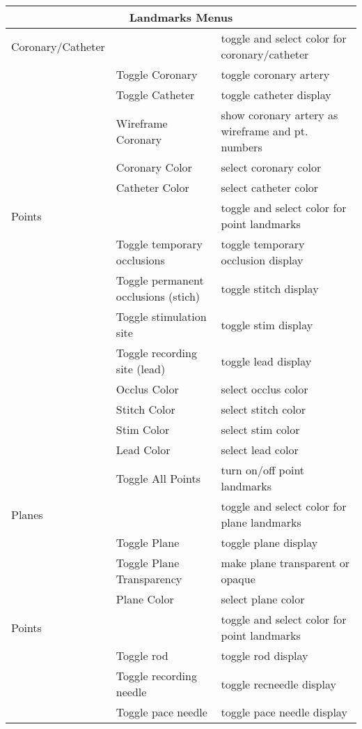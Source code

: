 \begin{table}[ht]
  \begin{center}
    \begin{tabular}{|l|p{1.5in}|p{3 in}|} \hline
      \multicolumn{3}{|c|}{\textbf{Landmarks Menus}} \\ \hline
    Coronary/Catheter & & toggle and select color for coronary/catheter\\
    & Toggle Coronary & toggle coronary artery \\
    & Toggle Catheter & toggle catheter display \\ 
    & Wireframe Coronary & show coronary artery as wireframe and pt. numbers\\
    & Coronary Color & select coronary color \\
    & Catheter Color & select catheter color \\ \hline
    Points & & toggle and select color for point landmarks\\
    & Toggle temporary occlusions & toggle temporary occlusion display\\
    & Toggle permanent occlusions (stich) & toggle stitch display \\ 
    & Toggle stimulation site & toggle stim display \\ 
    & Toggle recording site (lead) & toggle lead display \\ 
    & Occlus Color & select occlus color \\
    & Stitch Color & select stitch color \\
    & Stim Color & select stim color \\
    & Lead Color & select lead color \\
    & Toggle All Points & turn on/off point landmarks \\ \hline
    Planes & & toggle and select color for plane landmarks \\
    & Toggle Plane & toggle plane display \\
    & Toggle Plane Transparency & make plane transparent or opaque \\
    & Plane Color & select plane color \\ \hline
    Points & & toggle and select color for point landmarks \\
    & Toggle rod & toggle rod display\\
    & Toggle recording needle & toggle recneedle display \\ 
    & Toggle pace needle & toggle pace needle display \\ 

\end{tabular}
\end{center}
\end{table}
